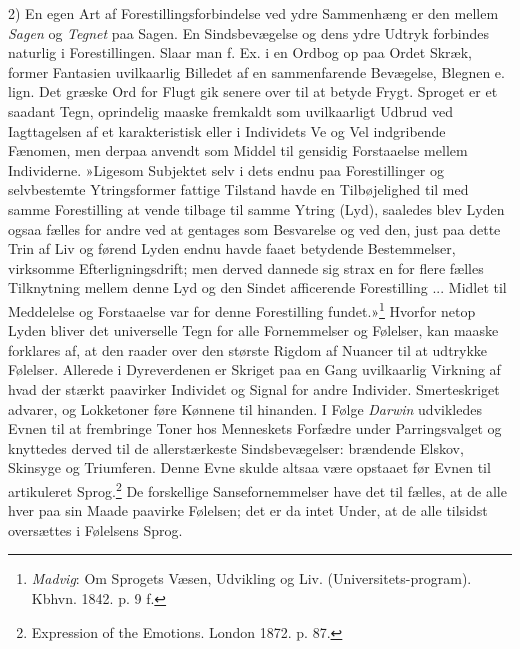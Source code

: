 \documentclass[12pt,a4paper,openany]{book}
\newcommand{\opage}[1]{\marginnote{\footnotesize\textit{[#1]}}}
\begin{document}
2) En egen Art af Forestillingsforbindelse ved ydre Sammenhæng er den
mellem \emph{Sagen} og \emph{Tegnet} paa Sagen. En Sindsbevægelse og
dens ydre Udtryk forbindes naturlig i Forestillingen. Slaar man f. Ex. i
en Ordbog op paa Ordet Skræk, former Fantasien uvilkaarlig Billedet af
en sammenfarende Bevægelse, Blegnen e. lign. Det græske Ord for Flugt
gik senere over til at betyde Frygt. Sproget er et saadant Tegn,
oprindelig maaske fremkaldt som uvilkaarligt Udbrud ved
\opage{191}Iagttagelsen af et karakteristisk eller i Individets Ve og
Vel indgribende Fænomen, men derpaa anvendt som Middel til gensidig
Forstaaelse mellem Individerne. »Ligesom Subjektet selv i dets endnu paa
Forestillinger og selvbestemte Ytringsformer fattige Tilstand havde en
Tilbøjelighed til med samme Forestilling at vende tilbage til samme
Ytring (Lyd), saaledes blev Lyden ogsaa fælles for andre ved at gentages
som Besvarelse og ved den, just paa dette Trin af Liv og førend Lyden
endnu havde faaet betydende Bestemmelser, virksomme Efterligningsdrift;
men derved dannede sig strax en for flere fælles Tilknytning mellem
denne Lyd og den Sindet afficerende Forestilling ... Midlet til
Meddelelse og Forstaaelse var for denne Forestilling
fundet.»\footnote[1]{\emph{Madvig}: Om Sprogets Væsen, Udvikling og Liv.
(Universitets-program). Kbhvn. 1842. p. 9 f.} Hvorfor netop Lyden bliver
det universelle Tegn for alle Fornemmelser og Følelser, kan maaske
forklares af, at den raader over den største Rigdom af Nuancer til at
udtrykke Følelser. Allerede i Dyreverdenen er Skriget paa en Gang
uvilkaarlig Virkning af hvad der stærkt paavirker Individet og Signal
for andre Individer. Smerteskriget advarer, og Lokketoner føre Kønnene
til hinanden. I Følge \emph{Darwin} udvikledes Evnen til at frembringe
Toner hos Menneskets Forfædre under Parringsvalget og knyttedes derved
til de allerstærkeste Sindsbevægelser: brændende Elskov, Skinsyge og
Triumferen. Denne Evne skulde altsaa være opstaaet før Evnen til
artikuleret Sprog.\footnote[2]{Expression of the Emotions. London 1872.
p. 87.} De forskellige Sansefornemmelser have det til fælles, at de alle
hver paa sin Maade paavirke Følelsen; det er da intet Under, at de alle
tilsidst oversættes i Følelsens Sprog.
\end{document}
